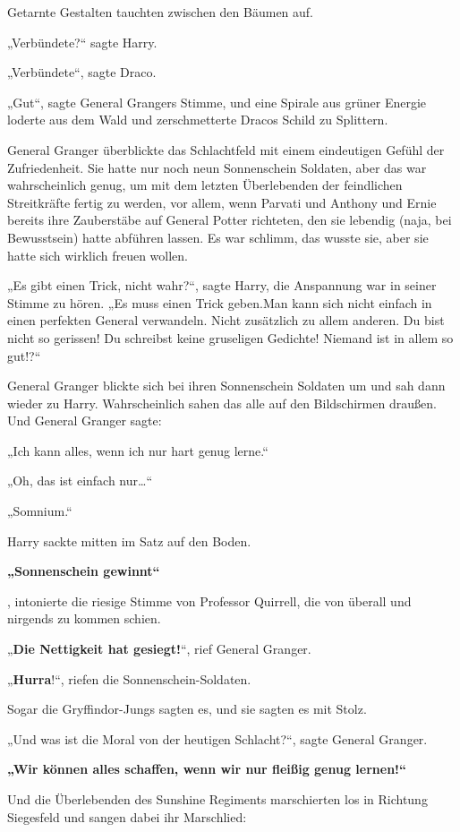 {Getarnte Gestalten tauchten zwischen den Bäumen auf.

„Verbündete?“ sagte Harry.

„Verbündete“, sagte Draco.

„Gut“, sagte General Grangers Stimme, und eine Spirale aus grüner Energie loderte aus dem Wald und zerschmetterte Dracos Schild zu Splittern.

General Granger überblickte das Schlachtfeld mit einem eindeutigen Gefühl der Zufriedenheit. Sie hatte nur noch neun Sonnenschein Soldaten, aber das war wahrscheinlich genug, um mit dem letzten Überlebenden der feindlichen Streitkräfte fertig zu werden, vor allem, wenn Parvati und Anthony und Ernie bereits ihre Zauberstäbe auf General Potter richteten, den sie lebendig (naja, bei Bewusstsein) hatte abführen lassen. Es war schlimm, das wusste sie, aber sie hatte sich wirklich freuen wollen.

„Es gibt einen Trick, nicht wahr?“, sagte Harry, die Anspannung war in seiner Stimme zu hören. „Es muss einen Trick geben.Man kann sich nicht einfach in einen perfekten General verwandeln. Nicht zusätzlich zu allem anderen. Du bist nicht so gerissen! Du schreibst keine gruseligen Gedichte! Niemand ist in allem so gut!?“

General Granger blickte sich bei ihren Sonnenschein Soldaten um und sah dann wieder zu Harry. Wahrscheinlich sahen das alle auf den Bildschirmen draußen. Und General Granger sagte:

„Ich kann alles, wenn ich nur hart genug lerne.“

„Oh, das ist einfach nur…“

„Somnium.“

Harry sackte mitten im Satz auf den Boden.

\textbf{„Sonnenschein gewinnt“}

, intonierte die riesige Stimme von Professor Quirrell, die von überall und nirgends zu kommen schien.

„\textbf{Die Nettigkeit hat gesiegt!}“, rief General Granger.

„\textbf{Hurra}!“, riefen die Sonnenschein-Soldaten.

Sogar die Gryffindor-Jungs sagten es, und sie sagten es mit Stolz.

„Und was ist die Moral von der heutigen Schlacht?“, sagte General Granger.

\textbf{„Wir können alles schaffen, wenn wir nur fleißig genug lernen!“}

Und die Überlebenden des Sunshine Regiments marschierten los in Richtung Siegesfeld und sangen dabei ihr Marschlied:

}
